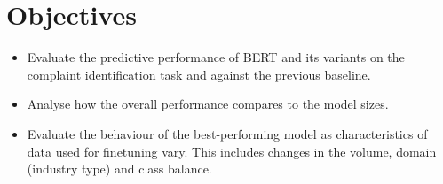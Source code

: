 \section{Objectives}

\begin{itemize}
    \item Evaluate the predictive performance of BERT and its variants on the complaint identification task and against the previous baseline.
    \item Analyse how the overall performance compares to the model sizes.
    \item Evaluate the behaviour of the best-performing model as characteristics of data used for finetuning vary. This includes changes in the volume, domain (industry type) and class balance.
\end{itemize}

